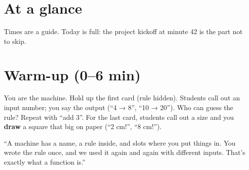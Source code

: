 \section{At a glance}
Times are a guide. Today is full: the project kickoff at minute 42 is the part not to skip.
\begin{timeplan}
\end{timeplan}

\section{Warm-up (0--6 min)}
\begin{unplugged}
You are the machine. Hold up the first card (rule hidden). Students call out an input number; you say the output (\enquote{4 → 8}, \enquote{10 → 20}). Who can guess the rule? Repeat with \enquote{add 3}. For the last card, students call out a size and you \textbf{draw} a square that big on paper (\enquote{2 cm!}, \enquote{8 cm!}).
\end{unplugged}
\begin{teacherscript}
\enquote{A machine has a name, a rule inside, and slots where you put things in. You wrote the rule once, and we used it again and again with different inputs. That's exactly what a function is.}
\end{teacherscript}

